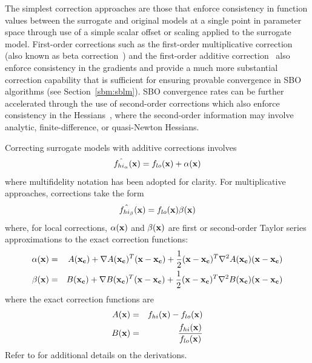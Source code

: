 The simplest correction approaches are those that enforce consistency
in function values between the surrogate and original models at a
single point in parameter space through use of a simple scalar offset
or scaling applied to the surrogate model.  First-order corrections
such as the first-order multiplicative correction (also known as beta
correction~\cite{Cha93}) and the first-order additive
correction~\cite{Lew00} also enforce consistency in the gradients and
provide a much more substantial correction capability that is
sufficient for ensuring provable convergence in SBO algorithms (see
Section~\ref{sbm:sblm}).  SBO convergence rates can be further
accelerated through the use of second-order corrections which also
enforce consistency in the Hessians~\cite{Eld04}, where the
second-order information may involve analytic, finite-difference, or
quasi-Newton Hessians.

Correcting surrogate models with additive corrections involves
\begin{equation}
\hat{f_{hi_{\alpha}}}({\bf x}) = f_{lo}({\bf x}) + \alpha({\bf x}) 
\label{eq:correct_val_add}
\end{equation}
where multifidelity notation has been adopted for clarity.  For
multiplicative approaches, corrections take the form
\begin{equation}
\hat{f_{hi_{\beta}}}({\bf x}) = f_{lo}({\bf x}) \beta({\bf x})
\label{eq:correct_val_mult}
\end{equation}
where, for local corrections, $\alpha({\bf x})$ and $\beta({\bf x})$
are first or second-order Taylor series approximations to the exact
correction functions:
\begin{eqnarray}
\alpha({\bf x}) & = & A({\bf x_c}) + \nabla A({\bf x_c})^T 
({\bf x} - {\bf x_c}) + \frac{1}{2} ({\bf x} - {\bf x_c})^T 
\nabla^2 A({\bf x_c}) ({\bf x} - {\bf x_c}) \label{eq:taylor_a} \\
\beta({\bf x})  & = & B({\bf x_c}) + \nabla B({\bf x_c})^T 
({\bf x} - {\bf x_c}) + \frac{1}{2} ({\bf x} - {\bf x_c})^T \nabla^2 
B({\bf x_c}) ({\bf x} - {\bf x_c}) \label{eq:taylor_b}
\end{eqnarray}
where the exact correction functions are
\begin{eqnarray}
A({\bf x}) & = & f_{hi}({\bf x}) - f_{lo}({\bf x})       \label{eq:exact_A} \\
B({\bf x}) & = & \frac{f_{hi}({\bf x})}{f_{lo}({\bf x})} \label{eq:exact_B}
\end{eqnarray}
Refer to \cite{Eld04} for additional details on the derivations.

